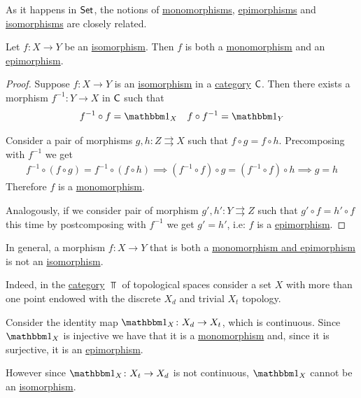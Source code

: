 \documentclass[../../main]{subfiles}
\begin{document}
As it happens in \(\mathsf{Set}\), the notions of \hyperref[def:mono-epi-morphism]{monomorphisms}, \hyperref[def:mono-epi-morphism]{epimorphisms} and \hyperref[def:categorical-isomorphism]{isomorphisms} are closely related.
\begin{proposition}
  Let \(f\colon X \to Y\) be an \hyperref[def:categorical-isomorphism]{isomorphism}.
  Then \(f\) is both a \hyperref[def:mono-epi-morphism]{monomorphism} and an \hyperref[def:mono-epi-morphism]{epimorphism}.
\end{proposition}
\begin{proof}
  Suppose \(f\colon X \to Y\) is an \hyperref[def:categorical-isomorphism]{isomorphism} in a \hyperref[def:category]{category} \(\mathsf{C}\).
  Then there exists a morphism \(f^{-1}\colon Y \to X\) in \(\mathsf{C}\) such that
  \begin{equation*}
    f^{-1} \circ f = \id_{X} \quad f \circ f^{-1} = \id_{Y}
  \end{equation*}

  Consider a pair of morphisms \(g, h\colon Z \rightrightarrows X\) such that \(f \circ g = f \circ h\).
  Precomposing with \(f^{-1}\) we get
  \begin{align*}
    f^{-1} \circ (f \circ g) = f^{-1} \circ (f \circ h) \implies (f^{-1} \circ f) \circ g = (f^{-1} \circ f) \circ h \implies g = h
  \end{align*}
  Therefore \(f\) is a \hyperref[def:mono-epi-morphism]{monomorphism}.

  Analogously, if we consider pair of morphism \(g', h'\colon Y \rightrightarrows Z\) such that \(g' \circ f = h' \circ f\) this time by postcomposing with \(f^{-1}\) we get \(g' = h'\), i.e: \(f\) is a \hyperref[def:mono-epi-morphism]{epimorphism}.
\end{proof}

\begin{example}
  In general, a morphism \(f\colon X \to Y\) that is both a \hyperref[def:mono-epi-morphism]{monomorphism and epimorphism} is not an \hyperref[def:categorical-isomorphism]{isomorphism}.

  Indeed, in the \hyperref[def:category]{category} \(\Top\) of topological spaces consider a set \(X\) with more than one point endowed with the discrete \(X_{d}\) and trivial \(X_{t}\) topology.
  
  Consider the identity map \(\id_{X}\colon X_{d} \to X_{t}\), which is continuous.
  Since \(\id_{X}\) is injective we have that it is a \hyperref[def:mono-epi-morphism]{monomorphism} and, since it is surjective, it is an \hyperref[def:mono-epi-morphism]{epimorphism}.

  However since \(\id_{X}\colon X_{t} \to X_{d}\) is not continuous, \(\id_{X}\) cannot be an \hyperref[def:categorical-isomorphism]{isomorphism}.
\end{example}
\end{document}
